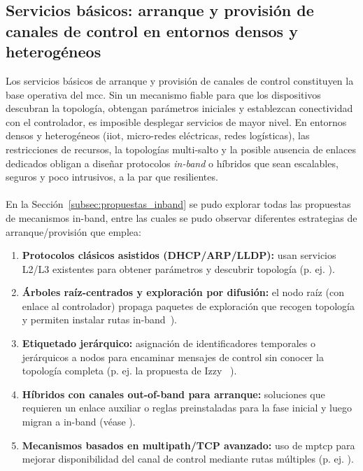 \subsection{Servicios básicos: arranque y provisión de canales de control en entornos densos y heterogéneos}

Los servicios básicos de arranque y provisión de canales de control constituyen la base operativa del \gls{mcc}. Sin un mecanismo fiable para que los dispositivos descubran la topología, obtengan parámetros iniciales y establezcan conectividad con el controlador, es imposible desplegar servicios de mayor nivel. En entornos densos y heterogéneos (\gls{iiot}, micro-redes eléctricas, redes logísticas), las restricciones de recursos, la topologías multi-salto y la posible ausencia de enlaces dedicados obligan a diseñar protocolos \emph{in-band} o híbridos que sean escalables, seguros y poco intrusivos, a la par que resilientes.\\
\\
En la Sección~\ref{subsec:propuestas_inband} se pudo explorar todas las propuestas de mecanismos in-band, entre las cuales se pudo observar diferentes estrategias de arranque/provisión que emplea:

\begin{enumerate}
  \item \textbf{Protocolos clásicos asistidos (DHCP/ARP/LLDP):} usan servicios L2/L3 existentes para obtener parámetros y descubrir topología (p. ej. \cite{Sharma13}).
  
  \item \textbf{Árboles raíz-centrados y exploración por difusión:} el nodo raíz (con enlace al controlador) propaga paquetes de exploración que recogen topología y permiten instalar rutas in-band~\cite{Lopez-Pajares19}).
  
  \item \textbf{Etiquetado jerárquico:} asignación de identificadores temporales o jerárquicos a nodos para encaminar mensajes de control sin conocer la topología completa (p. ej. la propuesta de Izzy ~\cite{Holzmann19}).
  
  \item \textbf{Híbridos con canales out-of-band para arranque:} soluciones que requieren un enlace auxiliar o reglas preinstaladas para la fase inicial y luego migran a in-band (véase \cite{Gonzalez18,Su17}).
  
  \item \textbf{Mecanismos basados en multipath/TCP avanzado:} uso de \gls{mptcp} para mejorar disponibilidad del canal de control mediante rutas múltiples (p. ej. \cite{Raza17}).
  
\end{enumerate}

